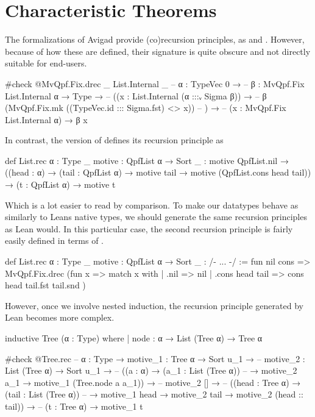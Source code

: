 \section{Characteristic Theorems}

The formalizations of Avigad \etal{} provide (co)recursion principles, as  and .
However, because of how these are defined, their signature is quite obscure and not directly suitable for end-users.
\begin{leancode}
  #check @MvQpf.Fix.drec _ List.Internal _
  -- {α : TypeVec 0} →
  --   {β : MvQpf.Fix List.Internal α → Type} →
  --     ((x : List.Internal (α :::ᵥ Sigma β)) → 
  --        β (MvQpf.Fix.mk ((TypeVec.id ::: Sigma.fst) <$$> x))
  --     ) →
  --       (x : MvQpf.Fix List.Internal α) → β x
\end{leancode}

In contrast, the \inductive{} version of  defines its recursion principle as
\begin{leancode}
  def List.rec {α : Type _} {motive : QpfList α → Sort _} :
  motive QpfList.nil 
    → ((head : α) → (tail : QpfList α) → motive tail 
                                          → motive (QpfList.cons head tail))
    → (t : QpfList α) 
    → motive t
\end{leancode}

Which is a lot easier to read by comparison. To make our datatypes behave as similarly to Leans native
\inductive{} types, we should generate the same recursion principles as Lean would.
In this particular case, the second recursion principle is fairly easily defined in terms of .
\begin{leancode}
  def List.rec {α : Type _} {motive : QpfList α → Sort _} : /- ... -/ :=
    fun nil cons => MvQpf.Fix.drec (fun x => 
      match x with
      | .nil            => nil
      | .cons head tail => cons head tail.fst tail.snd
    )
\end{leancode}

However, once we involve nested induction, the recursion principle generated by Lean becomes more complex.

\begin{leancode}
  inductive Tree (α : Type) where
  | node : α → List (Tree α) → Tree α

  #check @Tree.rec
  -- {α : Type} → {motive_1 : Tree α → Sort u_1} →
  --   {motive_2 : List (Tree α) → Sort u_1} →
  --   ((a : α) → (a_1 : List (Tree α)) 
  --        → motive_2 a_1 → motive_1 (Tree.node a a_1)) →
  --   motive_2 [] →
  --   ((head : Tree α) → (tail : List (Tree α)) 
  --        → motive_1 head → motive_2 tail → motive_2 (head :: tail)) →
  --   (t : Tree α) → motive_1 t
\end{leancode}


